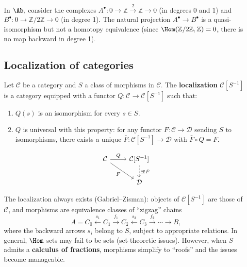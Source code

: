 \begin{example}\label{ex:quasi-iso-not-homotopy}
In $\Ab$, consider the complexes $A^\bullet \colon 0 \to \mathbb{Z} \xrightarrow{2} \mathbb{Z} \to 0$
(in degrees 0 and 1) and $B^\bullet \colon 0 \to \mathbb{Z}/2\mathbb{Z} \to 0$ (in degree 1).
The natural projection $A^\bullet \to B^\bullet$ is a quasi-isomorphism but not a homotopy
equivalence (since $\Hom(\mathbb{Z}/2\mathbb{Z}, \mathbb{Z}) = 0$, there is no map backward
in degree 1).
\end{example}

\subsection{Localization of categories}\label{subsec:localization}

\begin{definition}[Localization]\label{def:localization-cat}
Let $\mathcal{C}$ be a category and $S$ a class of morphisms in $\mathcal{C}$.
The \textbf{localization} $\mathcal{C}[S^{-1}]$ is a category equipped with a functor
$Q \colon \mathcal{C} \to \mathcal{C}[S^{-1}]$ such that:
\begin{enumerate}
    \item $Q(s)$ is an isomorphism for every $s \in S$.
    \item $Q$ is universal with this property: for any functor $F \colon \mathcal{C} \to \mathcal{D}$
    sending $S$ to isomorphisms, there exists a unique $\bar{F} \colon \mathcal{C}[S^{-1}] \to \mathcal{D}$
    with $\bar{F} \circ Q = F$.
\end{enumerate}
\[
\begin{tikzcd}
    \mathcal{C} \arrow[r, "Q"] \arrow[rd, "F"'] & \mathcal{C}[S^{-1}] \arrow[d, dashed, "\exists!\bar{F}"] \\
    & \mathcal{D}
\end{tikzcd}
\]
\end{definition}

\begin{remark}\label{rem:localization-construction}
The localization always exists (Gabriel--Zisman): objects of $\mathcal{C}[S^{-1}]$ are those
of $\mathcal{C}$, and morphisms are equivalence classes of ``zigzag'' chains
\[
    A = C_0 \xleftarrow{s_1} C_1 \xrightarrow{f_1} C_2 \xleftarrow{s_2}
    C_3 \xrightarrow{f_2} \cdots \to B,
\]
where the backward arrows $s_i$ belong to $S$, subject to appropriate relations.
In general, $\Hom$ sets may fail to be sets (set-theoretic issues). However,
when $S$ admits a \textbf{calculus of fractions},
morphisms simplify to ``roofs'' and the issues become manageable.
\end{remark}

